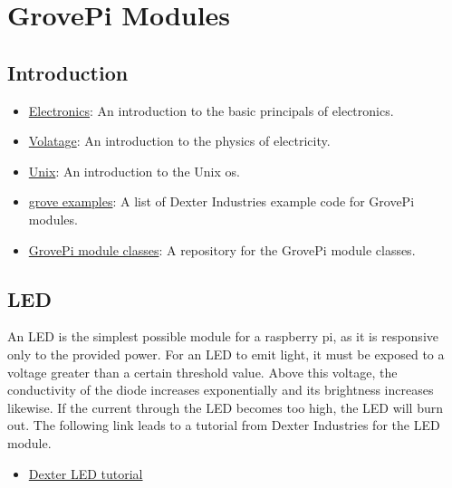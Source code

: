 

\chapter{GrovePi Modules}\label{grovepi-modules}

\FILENAME

\section{Introduction}\label{intro}

\begin{itemize}
\tightlist
\item
  \href{http://www.instructables.com/id/Basic-Electronics}{Electronics}:
  An introduction to the basic principals of electronics.
\item
  \href{https://learn.sparkfun.com/tutorials/voltage-current-resistance-and-ohms-law}{Volatage}:
  An introduction to the physics of electricity.
\item
  \href{https://info-ee.eps.surrey.ac.uk/Teaching/Unix/index.html}{Unix}:
  An introduction to the Unix os.
\item
  \href{https://github.com/DexterInd/GrovePi/tree/master/Software/Python}{grove
  examples}: A list of Dexter Industries example code for GrovePi
  modules.
\item
  \href{https://github.com/cloudmesh/cloudmesh.pi/tree/master/cloudmesh/pi}{GrovePi
  module classes}: A repository for the GrovePi module classes.
\end{itemize}

\section{LED}\label{led}

An LED is the simplest possible module for a raspberry pi, as it is
responsive only to the provided power. For an LED to emit light, it must
be exposed to a voltage greater than a certain threshold value. Above
this voltage, the conductivity of the diode increases exponentially and
its brightness increases likewise. If the current through the LED
becomes too high, the LED will burn out. The following link leads to a
tutorial from Dexter Industries for the LED module.

\begin{itemize}
\tightlist
\item
  \href{https://www.dexterindustries.com/GrovePi/projects-for-the-raspberry-pi/raspberry-pi-led-tutorial/}{Dexter
  LED tutorial}
\end{itemize}

